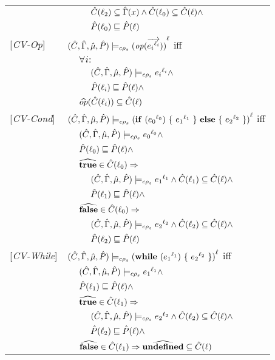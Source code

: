 \begin{tabular}{l l l l}
&&&$\Cat(\ell_2) \subseteq \Env(x) \wedge \Cat(\ell_0) \subseteq \Cat(\ell) \wedge$\\
&&&$\Pat(\ell_0) \sqsubseteq \Pat(\ell) $\\
{[\textit{CV-Op}]}&\multicolumn{3}{l}{$ \ccestl {\op (\vec{\lbt i})} $ iff}\\
&&\multicolumn{2}{l}{$\forall i :$}\\
&&&$\ccest {\lbt i} \wedge $\\
&&&$\Pat(\ell_i) \sqsubseteq \Pat(\ell) \wedge$\\
&&\multicolumn{2}{l}{$\widehat{op} (\Cat(\ell_i)) \subseteq \Cat(\ell) $}\\
{[\textit{CV-Cond}]}&\multicolumn{3}{l}{$\ccestl{\cond {\lbt 0} {\lbt 1} {\lbt 2}} $ iff}\\
&&\multicolumn{2}{l}{$ \ccest {\lbt 0} \wedge $}\\
&&\multicolumn{2}{l}{$\Pat(\ell_0) \sqsubseteq \Pat(\ell) \wedge$} \\
&&\multicolumn{2}{l}{$\widehat{\true} \in \Cat(\ell_0) \Rightarrow$}\\
&&&$\ccest {\lbt 1} \wedge \Cat(\ell_1) \subseteq \Cat(\ell)\wedge$\\
&&&$\Pat(\ell_1) \sqsubseteq \Pat(\ell) \wedge$ \\
&&\multicolumn{2}{l}{$\widehat{\false} \in \Cat(\ell_0) \Rightarrow$}\\
&&&$\ccest {\lbt 2} \wedge \Cat(\ell_2) \subseteq \Cat(\ell) \wedge$\\
&&&$\Pat(\ell_2) \sqsubseteq \Pat(\ell)$ \\
{[\textit{CV-While}]}&\multicolumn{3}{l}{$\ccestl {\while {\lbt 1} {\lbt 2}} $ iff}\\
&&\multicolumn{2}{l}{$ \ccest {\lbt 1} \wedge $}\\
&&\multicolumn{2}{l}{$\Pat(\ell_1) \sqsubseteq \Pat(\ell) \wedge$} \\
&&\multicolumn{2}{l}{$\widehat{\true} \in \Cat(\ell_1) \Rightarrow$}\\
&&&$\ccest {\lbt 2} \wedge \Cat(\ell_2) \subseteq \Cat(\ell) \wedge$\\
&&&$ \Pat(\ell_2) \sqsubseteq \Pat(\ell) \wedge$\\
&&\multicolumn{2}{l}{$\widehat{\false} \in \Cat(\ell_1) \Rightarrow \widehat{\undef} \subseteq \Cat(\ell)$}\\
\end{tabular}

